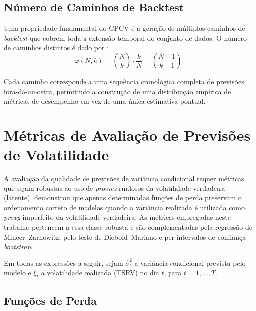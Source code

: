 \subsection{Número de Caminhos de Backtest}
\label{subsec:cpcv_caminhos}

Uma propriedade fundamental do CPCV é a geração de múltiplos caminhos de
\emph{backtest} que cobrem toda a extensão temporal do conjunto de dados.
O número de caminhos distintos é dado
por \cite{lopez2018advances}:
%
\begin{equation}
    \label{eq:cpcv_paths}
    \varphi(N,k) = \binom{N}{k}\cdot\frac{k}{N}
    = \binom{N-1}{k-1}.
\end{equation}

Cada caminho corresponde a uma sequência cronológica completa de previsões
fora-da-amostra, permitindo a construção de uma distribuição empírica de
métricas de desempenho em vez de uma única estimativa pontual. 

\section{Métricas de Avaliação de Previsões de Volatilidade}
\label{sec:metricas}

A avaliação da qualidade de previsões de variância condicional requer
métricas que sejam robustas ao uso de \emph{proxies} ruidosos da
volatilidade verdadeira (latente).  demonstrou que
apenas determinadas funções de perda preservam o ordenamento correto de
modelos quando a variância realizada é utilizada como \emph{proxy}
imperfeito da volatilidade verdadeira. As métricas empregadas neste trabalho
pertencem a essa classe robusta e são complementadas pela regressão de
Mincer--Zarnowitz, pelo teste de Diebold--Mariano e por intervalos de
confiança \emph{bootstrap}.

Em todas as expressões a seguir, sejam $\hat{\sigma}_t^2$ a variância
condicional prevista pelo modelo e $\xi_t$ a volatilidade realizada (TSRV)
no dia $t$, para $t = 1, \ldots, T$.

\subsection{Funções de Perda}
\label{subsec:funcoes_perda}

